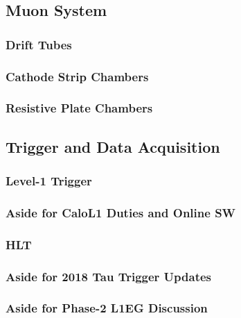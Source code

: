 \subsection{Muon System}
\subsubsection{Drift Tubes}
\subsubsection{Cathode Strip Chambers}
\subsubsection{Resistive Plate Chambers}
\subsection{Trigger and Data Acquisition}
\subsubsection{Level-1 Trigger}
\subsubsection{Aside for CaloL1 Duties and Online SW}
\subsubsection{HLT}
\subsubsection{Aside for 2018 Tau Trigger Updates}
\subsubsection{Aside for Phase-2 L1EG Discussion}
